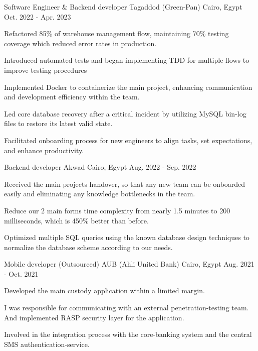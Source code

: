 \begin{cventries}
  \cventry
    {Software Engineer \& Backend developer} %
    {Tagaddod (Green-Pan)} %
    {Cairo, Egypt} %
    {Oct. 2022 - Apr. 2023} %
    {
      \begin{cvitems} %
        \item {Refactored 85\% of warehouse management flow, maintaining 70\% testing coverage which reduced error rates in production.}
        \item {Introduced automated tests and began implementing TDD for multiple flows to improve testing procedures}
        \item {Implemented Docker to containerize the main project, enhancing communication and development efficiency within the team.}
        \item {Led core database recovery after a critical incident by utilizing MySQL bin-log files to restore its latest valid state.
              }
        \item {Facilitated onboarding process for new engineers to align tasks, set expectations, and enhance productivity.}
      \end{cvitems}
    }

  \cventry
    {Backend developer} %
    {Akwad} %
    {Cairo, Egypt} %
    {Aug. 2022 - Sep. 2022} %
    {
      \begin{cvitems} %
        \item {Received the main projects handover, so that any new team can be onboarded easily and eliminating any knowledge bottlenecks in the team.}
        \item {Reduce our 2 main forms time complexity from nearly 1.5 minutes to 200 milliseconds, which is 450\% better than before.}
        \item {Optimized multiple SQL queries using the known database design techniques to normalize the database scheme according to our needs.}
      \end{cvitems}
    }

  \cventry
    {Mobile developer (Outsourced)} %
    {AUB (Ahli United Bank)} %
    {Cairo, Egypt} %
    {Aug. 2021 - Oct. 2021} %
    {
      \begin{cvitems} %
        \item {Developed the main custody application within a limited margin.}
        \item {I was responsible for communicating with an external penetration-testing team. And implemented RASP security layer for the application.}
        \item {Involved in the integration process with the core-banking system and the central SMS authentication-service.}
      \end{cvitems}
    }


\end{cventries}
